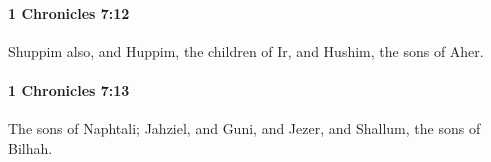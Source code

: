 		\paragraph{1 Chronicles 7:12} %
			\label{1CHRONICLES-7-12}

			Shuppim also, and Huppim, the children of Ir, and Hushim, the sons of Aher.


		\paragraph{1 Chronicles 7:13} %
			\label{1CHRONICLES-7-13}

			The sons of Naphtali; Jahziel, and Guni, and Jezer, and Shallum, the sons of Bilhah.


